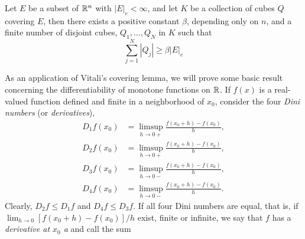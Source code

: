 \begin{theorem}
Let $E$ be a subset of $\mathbb{R}^n$ with $|E|_e<\infty$, and let $K$ be a
collection of cubes $Q$ covering $E$, then there exists a positive constant
$\beta$, depending only on $n$, and a finite number of disjoint cubes,
$Q_1,\dotsc,Q_N$ in $K$ such that
\[
\sum_{j=1}^N|Q_j|\geq\beta|E|_e
\]
\end{theorem}

As an application of Vitali's covering lemma, we will prove some basic
result concerning the differentiability of monotone functions on $\mathbb{R}$. If
$f(x)$ is a real-valued function defined and finite in a neighborhood of
$x_0$, consider the four \emph{Dini numbers} (or \emph{derivatives}),
\[
\begin{aligned}
D_1f(x_0)&=\limsup_{h\to 0+}\frac{f(x_0+h)-f(x_0)}{h},\\
D_2f(x_0)&=\limsup_{h\to 0+}\frac{f(x_0+h)-f(x_0)}{h},\\
D_3f(x_0)&=\limsup_{h\to 0-}\frac{f(x_0+h)-f(x_0)}{h},\\
D_4f(x_0)&=\limsup_{h\to 0-}\frac{f(x_0+h)-f(x_0)}{h}.
\end{aligned}
\]
Clearly, $D_2f\leq D_1f$ and $D_4f\leq D_3f$. If all four Dini numbers are
equal, that is, if $\lim_{h\to 0}[f(x_0+h)-f(x_0)]/h$ exist, finite or
infinite, we say that $f$ has a \emph{derivative at $x_0$ a} and call the
sum

